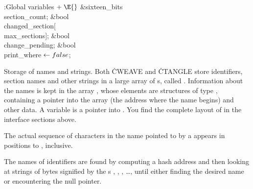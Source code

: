 \B{}:Global variables\X${}\mathrel+\E{}$\6
\&{sixteen\_bits} \\{section\_count};\6
\&{bool} \\{changed\_section}[\\{max\_sections}];\6
\&{bool} \\{change\_pending};\6
\&{bool} \\{print\_where}${}\leftarrow\\{false}{}$;\par
\fi

Storage of names and strings.
Both \.{CWEAVE} and \.{CTANGLE} store identifiers, section names and
other strings in a large array of s, called .
Information about the names is kept in the array , whose
elements are structures of type , containing a pointer into
the  array (the address where the name begins) and other
data.
A  variable is a pointer into .  You
find the
complete layout of  in the interface sections above.

The actual sequence of characters in the name pointed to by a  appears in positions  to , inclusive.

The names of identifiers are found by computing a hash address  and
then looking at strings of bytes signified by the s
, , , \dots,
until either finding the desired name or encountering the null pointer.

